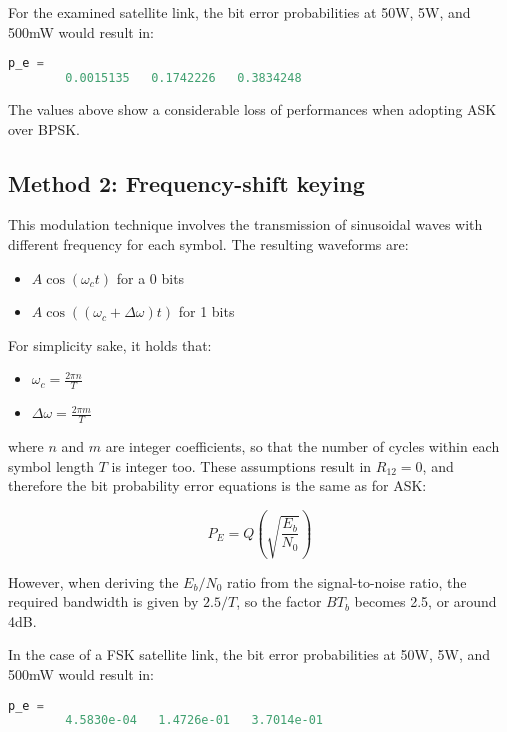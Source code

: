 For the examined satellite link, the bit error probabilities at 50W, 5W, and 500mW would result in:

\begin{lstlisting}[language=Octave]
    p_e =
        0.0015135   0.1742226   0.3834248
\end{lstlisting}

The values above show a considerable loss of performances when adopting ASK over BPSK.


\subsection{Method 2: Frequency-shift keying}
This modulation technique involves the transmission of sinusoidal waves with different frequency for each symbol.
The resulting waveforms are:

\begin{itemize}
	\item $A\cos(\omega_c t)$ for a 0 bits
	\item $A\cos((\omega_c + \Delta\omega) t)$ for 1 bits
\end{itemize}

For simplicity sake, it holds that:

\begin{itemize}
	\item $ \omega_c = \frac{2 \pi n}{T} $
	\item $ \Delta\omega = \frac{2 \pi m}{T} $
\end{itemize}

where $n$ and $m$ are integer coefficients, so that the number of cycles within each symbol length $T$ is integer too.
These assumptions result in $R_{12} = 0$, and therefore the bit probability error equations is the same as for ASK:

\begin{equation}
	P_E = Q\left(\sqrt{\frac{E_b}{N_0}}\right)
\end{equation}

However, when deriving the $E_b / N_0$ ratio from the signal-to-noise ratio, the required bandwidth is given by $2.5 / T$, so the factor $B T_b$ becomes 2.5, or around 4dB.

In the case of a FSK satellite link, the bit error probabilities at 50W, 5W, and 500mW would result in:

\begin{lstlisting}[language=Octave]
    p_e =
        4.5830e-04   1.4726e-01   3.7014e-01
\end{lstlisting}

